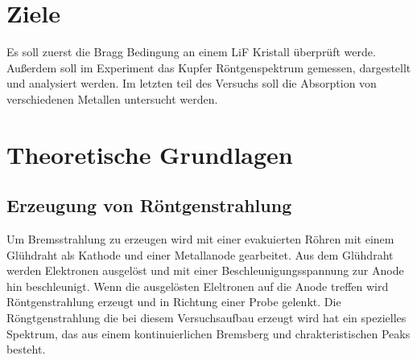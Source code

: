 \section{Ziele}
\label{sec:ziele}
Es soll zuerst die Bragg Bedingung an einem LiF Kristall überprüft werde.
Außerdem soll im Experiment das Kupfer Röntgenspektrum gemessen, dargestellt und analysiert werden.
Im letzten teil des Versuchs soll die Absorption von verschiedenen Metallen untersucht werden.
\section{Theoretische Grundlagen}
\label{sec:theorie}

\subsection{Erzeugung von Röntgenstrahlung}
Um Bremsstrahlung zu erzeugen wird mit einer evakuierten Röhren mit einem Glühdraht als Kathode und einer Metallanode gearbeitet.
Aus dem Glühdraht werden Elektronen ausgelöst und mit einer Beschleunigungsspannung zur Anode hin beschleunigt.
Wenn die ausgelösten Eleltronen auf die Anode treffen wird Röntgenstrahlung erzeugt und in Richtung einer Probe gelenkt.
Die Röngtgenstrahlung die bei diesem Versuchsaufbau erzeugt wird hat ein spezielles Spektrum, das aus einem kontinuierlichen Bremsberg und chrakteristischen Peaks besteht.

